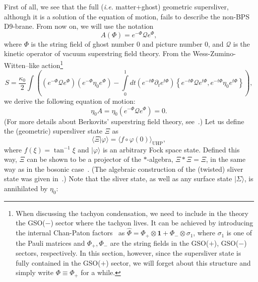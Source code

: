 \documentclass[a4paper,12pt]{article}
\newcommand{\cQ}{\mathcal{Q}}
\begin{document}
First of all, we see that the full (\textit{i.e.} matter+ghost) geometric supersliver, 
although it is a solution of the equation of motion, fails to describe the non-BPS D9-brane. 
From now on, we will use the notation 
\begin{equation}
A(\Phi)=e^{-\Phi}\cQ e^{\Phi}, \label{eq:CA}
\end{equation}
where $\Phi$ is the string field of ghost number 0 and picture number 0, and $\cQ$ is the 
kinetic operator of vacuum superstring field theory. From the Wess-Zumino-Witten--like 
action\footnote{When discussing the tachyon condensation, we need to include in the theory the 
GSO($-$) sector where the tachyon lives. It can be achieved by introducing the internal Chan-Paton 
factors~\cite{TPNS,BSZ} as $\widehat{\Phi}=\Phi_+\otimes\mathbf{1}+\Phi_-\otimes\sigma_1$, where 
$\sigma_1$ is one of the Pauli matrices and $\Phi_+,\Phi_-$ are the string fields in the 
GSO($+$), GSO($-$) sectors, respectively. In this section, however, since the supersliver state 
is fully contained in the GSO($+$) sector, we will forget about this 
structure and simply write $\Phi\equiv\Phi_+$ for a while.}~\cite{SSFT}
\begin{equation}
S=\frac{\kappa_0}{2}\int\left(\left(e^{-\Phi}\cQ e^{\Phi}\right)\left(e^{-\Phi}\eta_0 e^{\Phi}
\right)-\int\limits_0^1dt\left(e^{-t\Phi}\partial_te^{t\Phi}\right)\left\{e^{-t\Phi}\cQ e^{t\Phi},
e^{-t\Phi}\eta_0e^{t\Phi}\right\}\right), \label{eq:WZW}
\end{equation}
we derive the following equation of motion:
\begin{equation}
\eta_0A=\eta_0\left( e^{-\Phi}\cQ e^{\Phi}\right)=0. \label{eq:CB}
\end{equation}
(For more details about Berkovits' superstring field theory, see~\cite{SSFT,BSZ,Brev,0102085,Smet}.)
Let us define the (geometric) supersliver state $\Xi$ as 
\begin{equation}
\langle\Xi |\varphi\rangle =\langle f\circ\varphi(0)\rangle_{\mathrm{UHP}}, \label{eq:CC}
\end{equation}
where $f(\xi)=\tan^{-1}\xi$ and $|\varphi\rangle$ is an arbitrary Fock space state. 
Defined this way, $\Xi$ can be shown to be a projector of the $*$-algebra, $\Xi *\Xi =\Xi$, 
in the same way as in the bosonic case~\cite{RSZ4}. (The algebraic construction 
of the (twisted) sliver state was given 
in~\cite{KP,RSZ2}\cite{David,HK,HM,Kishimoto,Okuyama1}\cite{NSms, MS}\cite{NSgs}.) 
Note that the sliver state, as well as any surface state $|\Sigma\rangle$,
is annihilated by $\eta_0$:
\end{document}
